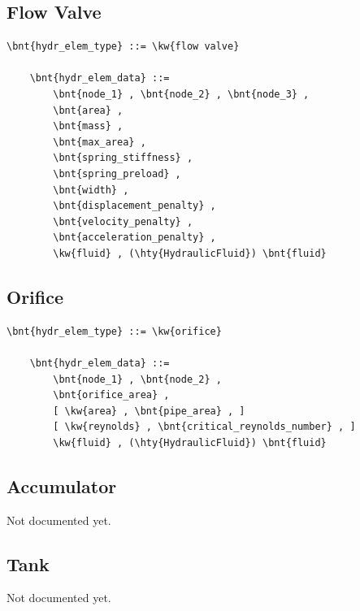 \subsection{Flow Valve}
\label{sec:EL:HYDR:FLOW_VALVE}
\begin{Verbatim}[commandchars=\\\{\}]
    \bnt{hydr_elem_type} ::= \kw{flow valve}

    \bnt{hydr_elem_data} ::=
        \bnt{node_1} , \bnt{node_2} , \bnt{node_3} ,
        \bnt{area} ,
        \bnt{mass} ,
        \bnt{max_area} ,
        \bnt{spring_stiffness} ,
        \bnt{spring_preload} ,
        \bnt{width} ,
        \bnt{displacement_penalty} ,
        \bnt{velocity_penalty} ,
        \bnt{acceleration_penalty} ,
        \kw{fluid} , (\hty{HydraulicFluid}) \bnt{fluid}
\end{Verbatim}



\subsection{Orifice}
\label{sec:EL:HYDR:ORIFICE}
\begin{Verbatim}[commandchars=\\\{\}]
    \bnt{hydr_elem_type} ::= \kw{orifice}

    \bnt{hydr_elem_data} ::=
        \bnt{node_1} , \bnt{node_2} ,
        \bnt{orifice_area} ,
        [ \kw{area} , \bnt{pipe_area} , ]
        [ \kw{reynolds} , \bnt{critical_reynolds_number} , ]
        \kw{fluid} , (\hty{HydraulicFluid}) \bnt{fluid}
\end{Verbatim}



\subsection{Accumulator}
\label{sec:EL:HYDR:ACCUMULATOR}
Not documented yet.



\subsection{Tank}
\label{sec:EL:HYDR:TANK}
Not documented yet.




